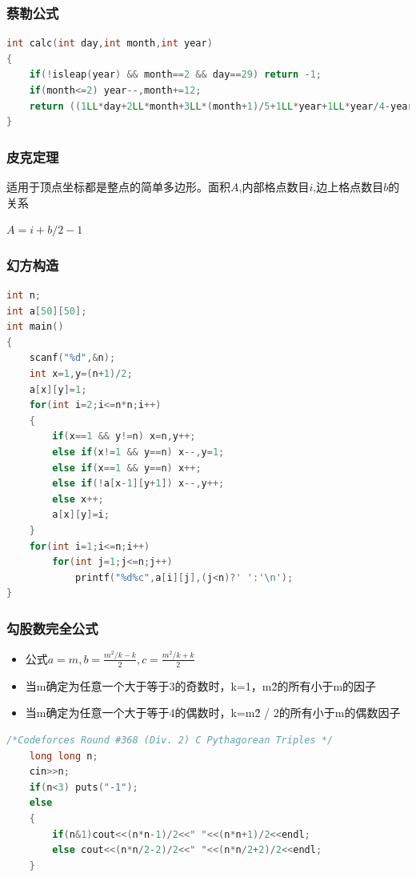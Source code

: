 \documentclass[UTF8,a4paper,titlepage]{ctexart}
\begin{document}
\subsubsection*{蔡勒公式}
\begin{lstlisting}[language=C++] 
int calc(int day,int month,int year)
{
    if(!isleap(year) && month==2 && day==29) return -1;
    if(month<=2) year--,month+=12;
    return ((1LL*day+2LL*month+3LL*(month+1)/5+1LL*year+1LL*year/4-year/100+year/400)%7+7)%7;
}  
\end{lstlisting}


\subsubsection*{皮克定理}
适用于顶点坐标都是整点的简单多边形。面积$A$,内部格点数目$i$,边上格点数目$b$的关系 \par 
$A=i+b/2-1$

\subsubsection*{幻方构造}
        \begin{lstlisting}[language=C++]
int n;
int a[50][50];
int main()
{
    scanf("%d",&n);
    int x=1,y=(n+1)/2;
    a[x][y]=1;
    for(int i=2;i<=n*n;i++)
    {
        if(x==1 && y!=n) x=n,y++;
        else if(x!=1 && y==n) x--,y=1;
        else if(x==1 && y==n) x++;
        else if(!a[x-1][y+1]) x--,y++;
        else x++;
        a[x][y]=i;
    }
    for(int i=1;i<=n;i++)
        for(int j=1;j<=n;j++)
            printf("%d%c",a[i][j],(j<n)?' ':'\n');
}
        \end{lstlisting}
\subsubsection*{勾股数完全公式}
\begin{itemize}
\item 公式$a=m,b=\frac{m^2/k-k}{2},c=\frac{m^2/k+k}{2}$
\item 当m确定为任意一个大于等于3的奇数时，k={1，m\^2的所有小于m的因子}
\item 当m确定为任意一个大于等于4的偶数时，k={m\^2 / 2的所有小于m的偶数因子}
\end{itemize}
         \begin{lstlisting}[language=C++]   
/*Codeforces Round #368 (Div. 2) C Pythagorean Triples */
    long long n;
    cin>>n;
    if(n<3) puts("-1");
    else
    {
        if(n&1)cout<<(n*n-1)/2<<" "<<(n*n+1)/2<<endl;
        else cout<<(n*n/2-2)/2<<" "<<(n*n/2+2)/2<<endl;
    }
        \end{lstlisting}
\end{document}
